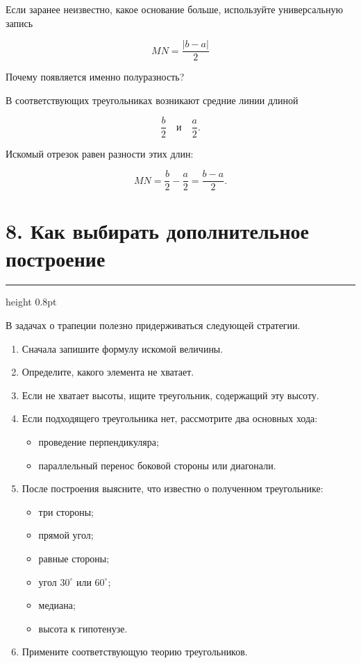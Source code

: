 \documentclass[a4paper,12pt]{article}
\newcommand{\sectionline}{
  \par
  \vspace{0.2em}
  {\color{accent}\hrule height 0.8pt}
  \vspace{0.7em}
}
\newcommand{\formula}[1]{
  \[
  \boxed{#1}
  \]
}
\begin{document}
Если заранее неизвестно, какое основание больше, используйте универсальную
запись

\formula{
MN=\frac{|b-a|}{2}
}

Почему появляется именно полуразность?

В соответствующих треугольниках возникают средние линии длиной

\[
\frac b2
\quad\text{и}\quad
\frac a2.
\]

Искомый отрезок равен разности этих длин:

\[
MN
=
\frac b2-\frac a2
=
\frac{b-a}{2}.
\]


\section*{8. Как выбирать дополнительное построение}
\sectionline

В задачах о трапеции полезно придерживаться следующей стратегии.

\begin{enumerate}
  \item Сначала запишите формулу искомой величины.
  
  \item Определите, какого элемента не хватает.
  
  \item Если не хватает высоты, ищите треугольник, содержащий эту высоту.
  
  \item Если подходящего треугольника нет, рассмотрите два основных хода:
  \begin{itemize}
    \item проведение перпендикуляра;
    \item параллельный перенос боковой стороны или диагонали.
  \end{itemize}
  
  \item После построения выясните, что известно о полученном треугольнике:
  \begin{itemize}
    \item три стороны;
    \item прямой угол;
    \item равные стороны;
    \item угол $30^\circ$ или $60^\circ$;
    \item медиана;
    \item высота к гипотенузе.
  \end{itemize}
  
  \item Примените соответствующую теорию треугольников.
\end{enumerate}
\end{document}
